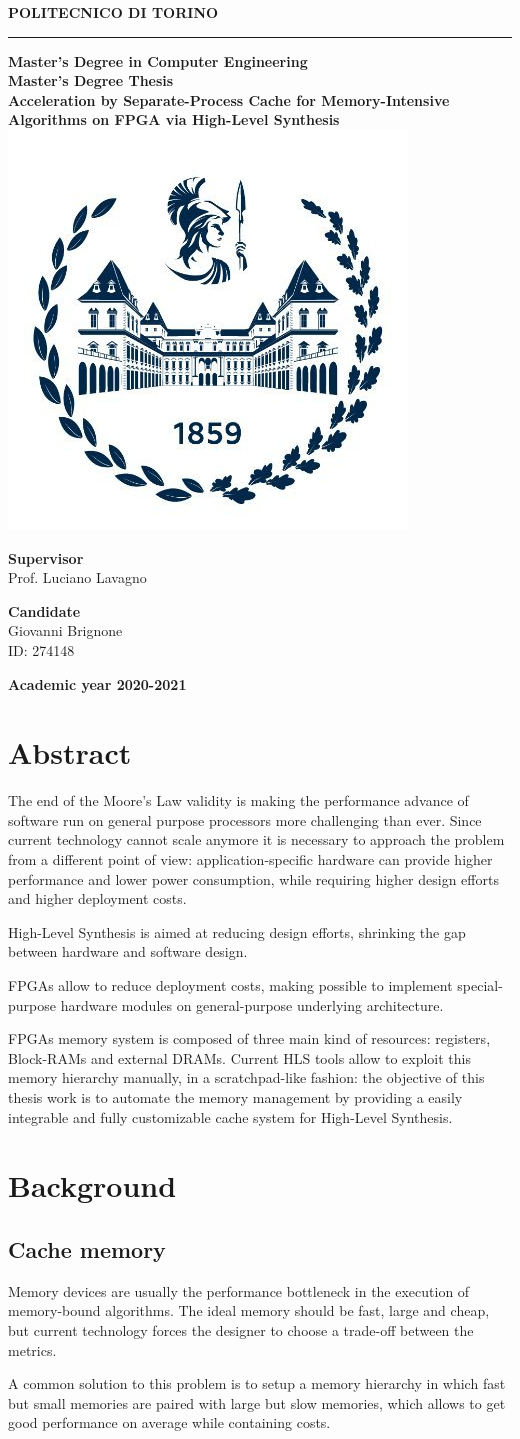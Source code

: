 \documentclass[11pt,a4paper]{memoir}
\renewcommand*{\maketitle}%
{
	\newgeometry{left=2cm,right=2cm,top=3cm,bottom=3.5cm}

	\begin{center}
		\begingroup
		{\Huge\textbf{POLITECNICO DI TORINO}}\\[\baselineskip]
		\rule{\textwidth}{2pt}\par
		\vspace*{1em}
		{\LARGE\textbf{Master's Degree in Computer Engineering}}\\[\baselineskip]
		\vspace*{1em}
		{\Large\textbf{Master's Degree Thesis}}\\
		\vspace*{2cm}
		{\huge\textbf{Acceleration by Separate-Process Cache for
		Memory-Intensive Algorithms on FPGA via High-Level Synthesis}}\\
		\vspace*{1cm}
		\includegraphics[width=.3\textwidth]{figures/polito-logo}
	\end{center}
	\vfill
	\begin{minipage}{0.4\textwidth}
		\begin{flushleft}
			{\Large
				\textbf{Supervisor}\\
				Prof. Luciano Lavagno
			}
		\end{flushleft}
	\end{minipage}
	\begin{minipage}{0.4\textwidth}
		\begin{flushright} 
			{\Large
				\textbf{Candidate}\\
				Giovanni Brignone\\
				ID: 274148
			}
		\end{flushright}
	\end{minipage}  
	\vspace*{2cm}
	\begin{center}
		{\Large\textbf{Academic year 2020-2021}}
	\end{center}
	\endgroup

	\restoregeometry 
}
\begin{document}
\pagestyle{empty}
\maketitle

\frontmatter
\chapter*{Abstract}
The end of the Moore's Law validity is making the performance advance of
software run on general purpose processors more challenging than ever.
Since current technology cannot scale anymore it is necessary to approach the
problem from a different point of view: application-specific hardware can
provide higher performance and lower power consumption, while requiring higher
design efforts and higher deployment costs.

High-Level Synthesis is aimed at reducing design efforts, shrinking the gap
between hardware and software design.

FPGAs allow to reduce deployment costs, making possible to implement
special-purpose hardware modules on general-purpose underlying architecture.

FPGAs memory system is composed of three main kind of resources: registers,
Block-RAMs and external DRAMs.
Current HLS tools allow to exploit this memory hierarchy manually, in a
scratchpad-like fashion: the objective of this thesis work is to automate the
memory management by providing a easily integrable and fully customizable cache
system for High-Level Synthesis.

\pagebreak
\tableofcontents*

\mainmatter
\chapter{Background}
\section{Cache memory}
Memory devices are usually the performance bottleneck in the execution of
memory-bound algorithms.
The ideal memory should be fast, large and cheap, but current technology forces
the designer to choose a trade-off between the metrics.

A common solution to this problem is to setup a memory hierarchy in
which fast but small memories are paired with large but slow memories, which
allows to get good performance on average while containing costs.
\end{document}
